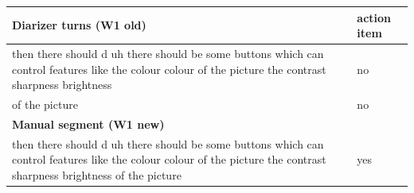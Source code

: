 \begin{tabular}{@{}p{}l@{}}
\toprule
\textbf{Diarizer turns (W1 old)} & \textbf{action item} \\
\midrule
then there should d uh there should be some buttons which can control features like the colour colour of the picture the contrast sharpness brightness & no \\
of the picture & no \\
\midrule
\textbf{Manual segment (W1 new)} & \\
\midrule
then there should d uh there should be some buttons which can control features like the colour colour of the picture the contrast sharpness brightness of the picture & yes \\
\bottomrule
\end{tabular}
